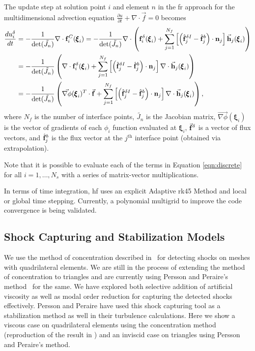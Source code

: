 The update step at solution point $i$ and element $n$ in the \gls{fr} approach for the multidimensional advection equation $\frac{\partial u}{\partial t} + \nabla \cdot \vec{f} = 0$ becomes
\begin{equation}
\label{eqn:discrete}
\begin{split}
\frac{d {u}^\delta_i}{d t} &= - \frac{1}{\text{det}(\tilde{J_n})} \nabla \cdot {\bf f}_i^C({\pmb \xi}_i) = - \frac{1}{\text{det}(\tilde{J_n})} \nabla \cdot \left({\bf f}_i^\delta({\pmb \xi}_i) + \sum^{N_f}_{j = 1} \left[\left( \hat{\bf f}^{\delta I}_j - \hat{\bf f}^b_j \right)\cdot {\bf n}_j \right]\vec{\bf h}_j ({\pmb \xi}_i) \right)\\
&=- \frac{1}{\text{det}(\tilde{J_n})} \left( \nabla \cdot {\bf f}_i^\delta({\pmb \xi}_i) + \sum^{N_f}_{j = 1} \left[\left( \hat{\bf f}^{\delta I}_j - \hat{\bf f}^b_j\right)\cdot {\bf n}_j \right]\nabla \cdot\vec{\bf h}_j ({\pmb \xi}_i)\right)\\
&=- \frac{1}{\text{det}(\tilde{J_n})} \left( \vec{\nabla \phi}({\pmb \xi}_i)^T  \cdot  \vec{\bf f} + \sum^{N_f}_{j = 1} \left[\left( \hat{\bf f}^{\delta I}_j - \hat{\bf f}^b_j\right)\cdot {\bf n}_j \right]\nabla \cdot\vec{\bf h}_j ({\pmb \xi}_i)\right),\\
\end{split}
\end{equation}
where $N_f$ is the number of interface points, $\tilde{J_n}$ is the Jacobian matrix, $\vec{\nabla \phi}({\pmb \xi}_i)$ is the vector of gradients of each $\phi_i$ function evaluated at ${\pmb \xi}_i$, $\vec{\bf f}^\delta$ is a vector of flux vectors, and $\hat{\bf f}^b_j$ is the flux vector at the $j^{\text{th}}$ interface point (obtained via extrapolation).

Note that it is possible to evaluate each of the terms in Equation \eqref{eqn:discrete} for all $i = 1,\dots,N_s$ with a series of matrix-vector multiplications.

In terms of time integration, \gls{hf} uses an explicit Adaptive \gls{rk45} Method and local or global time stepping. Currently, a polynomial multigrid to improve the code convergence is being validated.

\subsection{Shock Capturing and Stabilization Models}

We use the method of concentration described in~\cite{Sheshadri2014} for detecting shocks on meshes with quadrilateral elements. We are still in the process of extending the method of concentration to triangles and are currently using Persson and Peraire's method~\cite{persson2006sub, Persson13} for the same. We have explored both selective addition of artificial viscosity as well as modal order reduction for capturing the detected shocks effectively. Persson and Peraire have used this shock capturing tool as a stabilization method as well in their turbulence calculations. Here we show a viscous case on quadrilateral elements using the concentration method (reproduction of the result in \cite{Sheshadri2014}) and an inviscid case on triangles using Persson and Peraire's method. \\

